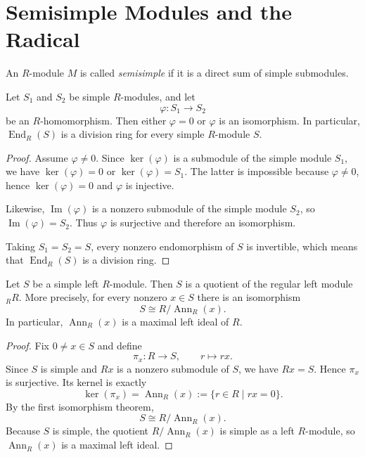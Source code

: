 \section{Semisimple Modules and the Radical}

\begin{definition}
    An $R$-module $M$ is called \emph{semisimple} if it is a direct sum of simple
    submodules.
\end{definition}

\begin{theorem}
    Let $S_1$ and $S_2$ be simple $R$-modules, and let
    \[
        \varphi:S_1\to S_2
    \]
    be an $R$-homomorphism. Then either $\varphi=0$ or $\varphi$ is an isomorphism.
    In particular, $\operatorname{End}_R(S)$ is a division ring for every simple $R$-module $S$.
\end{theorem}

\begin{proof}
    Assume $\varphi\neq 0$. Since $\ker(\varphi)$ is a submodule of the simple module $S_1$, we have $\ker(\varphi)=0$ or $\ker(\varphi)=S_1$. The latter is impossible
    because $\varphi\neq 0$, hence $\ker(\varphi)=0$ and $\varphi$ is injective.

    Likewise, $\operatorname{Im}(\varphi)$ is a nonzero submodule of the simple module $S_2$, so $\operatorname{Im}(\varphi)=S_2$. Thus $\varphi$ is surjective and
    therefore an isomorphism.

    Taking $S_1=S_2=S$, every nonzero endomorphism of $S$ is invertible, which means
    that $\operatorname{End}_R(S)$ is a division ring.
\end{proof}

\begin{lemma}
    Let $S$ be a simple left $R$-module. Then $S$ is a quotient of the regular left
    module ${}_R R$. More precisely, for every nonzero $x\in S$ there is an
    isomorphism
    \[
        S\cong R/\operatorname{Ann}_R(x).
    \]
    In particular, $\operatorname{Ann}_R(x)$ is a maximal left ideal of $R$.
\end{lemma}

\begin{proof}
    Fix $0\neq x\in S$ and define
    \[
        \pi_x:R\to S,\qquad r\mapsto rx.
    \]
    Since $S$ is simple and $Rx$ is a nonzero submodule of $S$, we have $Rx=S$.
    Hence $\pi_x$ is surjective. Its kernel is exactly
    \[
        \ker(\pi_x)=\operatorname{Ann}_R(x):=\{r\in R\mid rx=0\}.
    \]
    By the first isomorphism theorem,
    \[
        S\cong R/\operatorname{Ann}_R(x).
    \]
    Because $S$ is simple, the quotient $R/\operatorname{Ann}_R(x)$ is simple as a
    left $R$-module, so $\operatorname{Ann}_R(x)$ is a maximal left ideal.
\end{proof}

